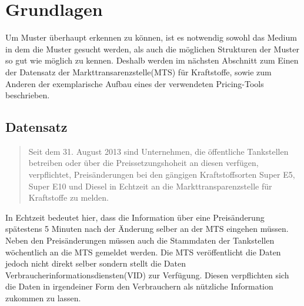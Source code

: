 \documentclass[12pt,a4paper,bibliography=totocnumbered,listof=totocnumbered]{scrartcl}
\begin{document}
\section{Grundlagen}
Um Muster überhaupt erkennen zu können, ist es notwendig sowohl das Medium in dem die Muster gesucht werden, als auch die möglichen Strukturen der Muster so gut wie möglich zu kennen. Deshalb werden im nächsten Abschnitt zum Einen der Datensatz der Markttransarenzstelle(MTS) für Kraftstoffe, sowie zum Anderen der exemplarische Aufbau eines der verwendeten Pricing-Tools beschrieben.

\subsection{Datensatz}

\begin{quote} 
\glqq Seit dem 31. August 2013 sind Unternehmen, die öffentliche Tankstellen betreiben oder über die Preissetzungshoheit an diesen verfügen, verpflichtet, Preisänderungen bei den gängigen Kraftstoffsorten Super E5, Super E10 und Diesel in Echtzeit an die Markttransparenzstelle für Kraftstoffe zu melden.\grqq\cite{BkMTS}
\end{quote}

In Echtzeit bedeutet hier, dass die Information über eine Preisänderung spätestens 5 Minuten nach der Änderung selber an der MTS eingehen müssen. Neben den Preisänderungen müssen auch die Stammdaten der Tankstellen wöchentlich an die MTS gemeldet werden. Die MTS veröffentlicht die Daten jedoch nicht direkt selber sondern stellt die Daten Verbraucherinformationsdiensten(VID) zur Verfügung. Diesen verpflichten sich die Daten in irgendeiner Form den Verbrauchern als nützliche Information zukommen zu lassen. 
\end{document}
